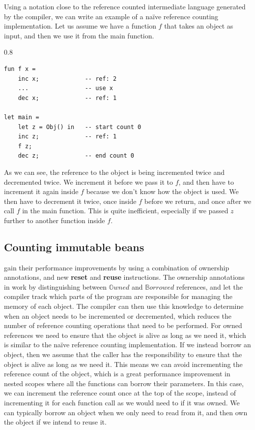 Using a notation close to the reference counted intermediate language generated by the compiler, we can write an example of a naïve reference counting implementation. Let us assume we have a function $f$ that takes an object as input, and then we use it from the main function.

\begin{spacing}{0.8}
\begin{Verbatim}
fun f x =
    inc x;             -- ref: 2
    ...                -- use x
    dec x;             -- ref: 1

let main =
    let z = Obj() in   -- start count 0
    inc z;             -- ref: 1
    f z;
    dec z;             -- end count 0
\end{Verbatim}
\end{spacing}

As we can see, the reference to the object is being incremented twice and decremented twice. We increment it before we pass it to $f$, and then have to increment it again inside $f$ because we don't know how the object is used. We then have to decrement it twice, once inside $f$ before we return, and once after we call $f$ in the main function. This is quite inefficient, especially if we passed $z$ further to another function inside $f$.


\subsection{Counting immutable beans}

\citeauthor*{ullrich_counting_2021} \cite{ullrich_counting_2021} gain their performance improvements by using a combination of ownership annotations, and new \textbf{reset} and \textbf{reuse} instructions.
The ownership annotations in  \cite{ullrich_counting_2021} work by distinguishing between $\mathbb{O}wned$ and $\mathbb{B}orrowed$ references, and let the compiler track which parts of the program are responsible for managing the memory of each object. The compiler can then use this knowledge to determine when an object needs to be incremented or decremented, which reduces the number of reference counting operations that need to be performed.
For owned references we need to ensure that the object is alive as long as we need it, which is similar to the naïve reference counting implementation.
If we instead borrow an object, then we assume that the caller has the responsibility to ensure that the object is alive as long as we need it. This means we can avoid incrementing the reference count of the object, which is a great performance improvement in nested scopes where all the functions can borrow their parameters. In this case, we can increment the reference count once at the top of the scope, instead of incrementing it for each function call as we would need to if it was owned.
We can typically borrow an object when we only need to read from it, and then own the object if we intend to reuse it.

